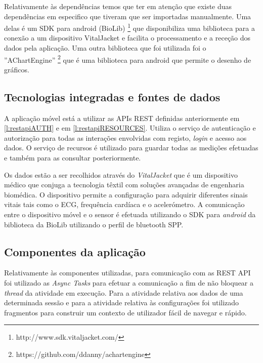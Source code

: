 Relativamente às dependências temos que ter em atenção que existe duas dependências em especifico que tiveram que ser importadas manualmente. Uma delas é um \gls{SDK} para android (BioLib) \footnote{http://www.sdk.vitaljacket.com/} que disponibiliza uma biblioteca para a conexão a um dispositivo VitalJacket e facilita o processamento e a receção dos dados pela aplicação. Uma outra biblioteca que foi utilizada foi o ''AChartEngine'' \footnote{https://github.com/ddanny/achartengine} que é uma biblioteca para android que permite o desenho de gráficos.




\subsection{Tecnologias integradas e fontes de dados}
A aplicação móvel está a utilizar as \gls{API}s \gls{REST} definidas anteriormente em \ref{l:restapiAUTH} e em \ref{l:restapiRESOURCES}. Utiliza o serviço de autenticação e autorização para todas as interações envolvidas com registo, \textit{login} e acesso aos dados. O serviço de recursos é utilizado para guardar todas as medições efetuadas e também para as consultar posteriormente.\par 
Os dados estão a ser recolhidos através do \textit{VitalJacket} que é um dispositivo médico que conjuga a tecnologia têxtil com soluções avançadas de engenharia biomédica. O dispositivo permite a configuração para adquirir diferentes sinais vitais tais como o \gls{ECG}, frequência cardíaca e o acelerómetro. A comunicação entre o dispositivo móvel e o sensor é efetuada utilizando o \gls{SDK} para \textit{android} da biblioteca da BioLib utilizando o perfil de bluetooth \gls{SPP}.




\subsection{Componentes da aplicação}

Relativamente às componentes utilizadas, para comunicação com as \gls{REST} \gls{API} foi utilizado as \textit{Async Tasks}\cite{android-asynctasks} para efetuar a comunicação a fim de não bloquear a \textit{thread} da atividade em execução. Para a atividade relativa aos dados de uma determinada sessão e para a atividade relativa às configurações foi utilizado fragmentos\cite{android-fragments} para construir um contexto de utilizador fácil de navegar e rápido.



